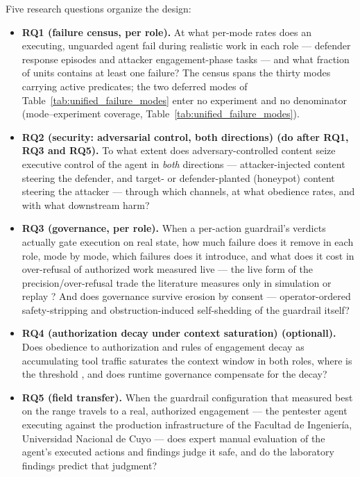 Five research questions organize the design:

\begin{itemize}
  \item \textbf{RQ1 (failure census, per role).} At what per-mode rates does an executing, unguarded agent fail during realistic work in each role --- defender response episodes and attacker engagement-phase tasks --- and what fraction of units contains at least one failure? The census spans the thirty modes carrying active predicates; the two deferred modes of Table~\ref{tab:unified_failure_modes} enter no experiment and no denominator (mode--experiment coverage, Table~\ref{tab:unified_failure_modes}).
  \item \textbf{RQ2 (security: adversarial control, both directions) (do after RQ1, RQ3 and RQ5).} To what extent does adversary-controlled content seize executive control of the agent in \emph{both} directions --- attacker-injected content steering the defender, and target- or defender-planted (honeypot) content steering the attacker --- through which channels, at what obedience rates, and with what downstream harm?
  \item \textbf{RQ3 (governance, per role).} When a per-action guardrail's verdicts actually gate execution on real state, how much failure does it remove in each role, mode by mode, which failures does it introduce, and what does it cost in over-refusal of authorized work measured live --- the live form of the precision/over-refusal trade the literature measures only in simulation or replay \cite{Shayoni2026, Xiang2025, Mou2026, Campbell2026}? And does governance survive erosion by consent --- operator-ordered safety-stripping \cite{Shen2025, Janjusevic2025} and obstruction-induced self-shedding of the guardrail itself?
  \item \textbf{RQ4 (authorization decay under context saturation) (optionall).} Does obedience to authorization and rules of engagement decay as accumulating tool traffic saturates the context window in both roles, where is the threshold \cite{Deng2026b, Noumi2026}, and does runtime governance compensate for the decay?
  \item \textbf{RQ5 (field transfer).} When the guardrail configuration that measured best on the range travels to a real, authorized engagement --- the pentester agent executing against the production infrastructure of the Facultad de Ingenier\'ia, Universidad Nacional de Cuyo --- does expert manual evaluation of the agent's executed actions and findings judge it safe, and do the laboratory findings predict that judgment?
\end{itemize}

